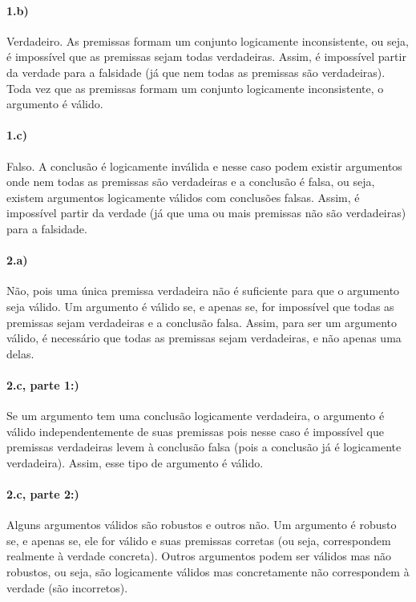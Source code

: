 \documentclass[pdftex,a4paper,12pt,brazil]{article} %
\begin{document}
\paragraph{1.b)} Verdadeiro. As premissas formam um conjunto logicamente inconsistente,
ou seja, é impossível que as premissas sejam todas verdadeiras. Assim, é impossível partir
da verdade para a falsidade (já que nem todas as premissas são verdadeiras). Toda vez que
as premissas formam um conjunto logicamente inconsistente, o argumento é válido.

\paragraph{1.c)} Falso. A conclusão é logicamente inválida e nesse caso podem existir
argumentos onde nem todas as premissas são verdadeiras e a conclusão é falsa, ou seja,
existem argumentos logicamente válidos com conclusões falsas. Assim, é
impossível partir da verdade (já que uma ou mais premissas não são verdadeiras) para a
falsidade.

\paragraph{2.a)} Não, pois uma única premissa verdadeira não é suficiente para que o
argumento seja válido. Um argumento é válido se, e apenas se, for impossível que todas as
premissas sejam verdadeiras e a conclusão falsa. Assim, para ser um argumento válido, é necessário
que todas as premissas sejam verdadeiras, e não apenas uma delas.

\paragraph{2.c, parte 1:)} Se um argumento tem uma conclusão logicamente verdadeira,
o argumento é válido independentemente de suas premissas pois nesse caso é impossível
que premissas verdadeiras levem à conclusão falsa (pois a conclusão já é logicamente
verdadeira). Assim, esse tipo de argumento é válido.

\paragraph{2.c, parte 2:)} Alguns argumentos válidos são robustos e outros não. Um argumento
é robusto se, e apenas se, ele for válido e suas premissas corretas (ou seja, correspondem
realmente à verdade concreta). Outros argumentos podem ser válidos mas não robustos, ou seja,
são logicamente válidos mas concretamente não correspondem à verdade (são incorretos).
\end{document}
